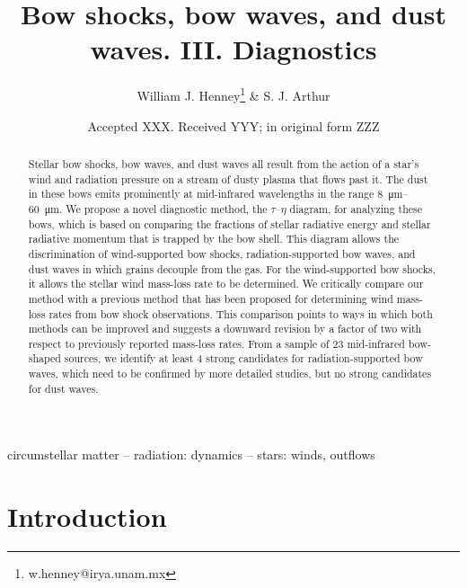\documentclass[useAMS, usenatbib, a4paper]{mnras}
\title
{Bow shocks, bow waves, and dust waves. III. Diagnostics}
\author[Henney \& Arthur]{
  William J. Henney\thanks{w.henney@irya.unam.mx}
  \& S. J. Arthur\\
  \AddressCRyA
}
\date{Accepted XXX. Received YYY; in original form ZZZ}
\begin{document}
\label{firstpage}
\pagerange{\pageref{firstpage}--\pageref{lastpage}}
\maketitle
\begin{abstract}
  Stellar bow shocks, bow waves, and dust waves all result from the
  action of a star's wind and radiation pressure on a stream of dusty
  plasma that flows past it.  The dust in these bows emits prominently
  at mid-infrared wavelengths in the range \SIrange{8}{60}{\um}. We
  propose a novel diagnostic method, the \(\tau\)--\(\eta\) diagram,
  for analyzing these bows, which is based on comparing the fractions
  of stellar radiative energy and stellar radiative momentum that is
  trapped by the bow shell.  This diagram allows the discrimination of
  wind-supported bow shocks, radiation-supported bow waves, and dust
  waves in which grains decouple from the gas.  For the wind-supported
  bow shocks, it allows the stellar wind mass-loss rate to be
  determined.  We critically compare our method with a previous method
  that has been proposed for determining wind mass-loss rates from bow
  shock observations. This comparison points to ways in which both
  methods can be improved and suggests a downward revision by a factor
  of two with respect to previously reported mass-loss rates.  From a
  sample of 23 mid-infrared bow-shaped sources, we identify at least 4
  strong candidates for radiation-supported bow waves, which need to
  be confirmed by more detailed studies, but no strong candidates for
  dust waves.
\end{abstract}

\begin{keywords}
  circumstellar matter -- radiation: dynamics -- stars: winds, outflows
\end{keywords}

\section{Introduction}
\label{sec:introduction}
\end{document}
